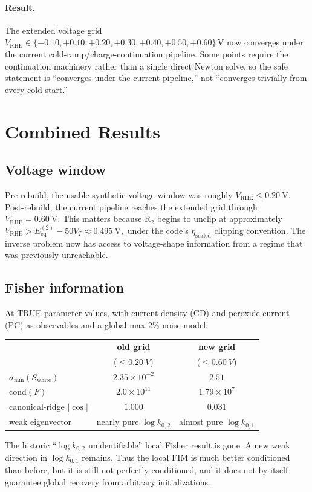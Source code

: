 \documentclass[11pt]{article}
\newcommand{\Eeq}{E_{\mathrm{eq}}}
\newcommand{\VRHE}{V_{\mathrm{RHE}}}
\newcommand{\VT}{V_{T}}
\begin{document}
\paragraph{Result.}
The extended voltage grid
$\VRHE \in \{-0.10, +0.10, +0.20, +0.30, +0.40, +0.50, +0.60\}$\,V now
converges under the current cold-ramp/charge-continuation pipeline. Some
points require the continuation machinery rather than a single direct Newton
solve, so the safe statement is ``converges under the current pipeline,'' not
``converges trivially from every cold start.''

\section{Combined Results}

\subsection*{Voltage window}
Pre-rebuild, the usable synthetic voltage window was roughly
$\VRHE \le \SI{+0.20}{\volt}$. Post-rebuild, the current pipeline reaches the
extended grid through $\VRHE = \SI{+0.60}{\volt}$. This matters because
$\mathrm{R}_2$ begins to unclip at approximately
\(
  \VRHE > \Eeq^{(2)} - 50\VT \approx \SI{+0.495}{\volt},
\)
under the code's $\eta_{\mathrm{scaled}}$ clipping convention. The inverse
problem now has access to voltage-shape information from a regime that was
previously unreachable.

\subsection*{Fisher information}
At TRUE parameter values, with current density (CD) and peroxide current (PC)
as observables and a global-max $2\%$ noise model:
\begin{center}
  \begin{tabular}{lcc}
    \toprule
                                       & \textbf{old grid}    & \textbf{new grid} \\
                                       & ($\le \SI{+0.20}{V}$) & ($\le \SI{+0.60}{V}$) \\
    \midrule
    $\sigma_{\min}(S_{\mathrm{white}})$ & $2.35\times 10^{-2}$ & $2.51$ \\
    $\mathrm{cond}(F)$                 & $2.0\times 10^{11}$  & $1.79\times 10^{7}$ \\
    canonical-ridge $|\cos|$           & $1.000$              & $0.031$ \\
    weak eigenvector                   & nearly pure $\log k_{0,2}$  & almost pure $\log k_{0,1}$ \\
    \bottomrule
  \end{tabular}
\end{center}
The historic ``$\log k_{0,2}$ unidentifiable'' local Fisher result is gone.
A new weak direction in $\log k_{0,1}$ remains. Thus the local FIM is much
better conditioned than before, but it is still not perfectly conditioned, and
it does not by itself guarantee global recovery from arbitrary initializations.
\end{document}
